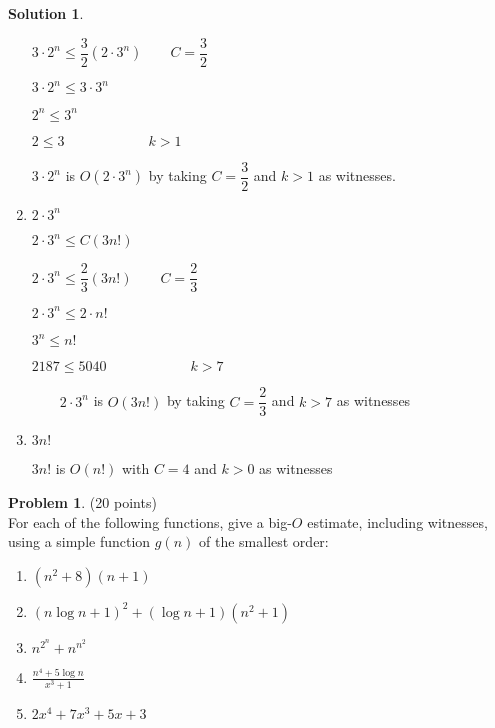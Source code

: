 \documentclass{article}
\theoremstyle{definition}
\newtheorem{problem}{Problem}
\newtheorem*{solution}{Solution}
\begin{document}
\begin{solution}
\begin{enumerate}
\qquad $3\cdot 2^{n}\leq \dfrac{3}{2}(2\cdot 3^{n})\qquad C=\dfrac{3}{2}$

\qquad $3\cdot 2^{n}\leq 3\cdot 3^{n}$

\qquad $2^{n}\leq 3^{n}$

\qquad $2\leq 3\qquad \qquad \qquad k>1$

\qquad $3\cdot 2^{n}$ is $O(2\cdot 3^{n})$ by taking $C=\dfrac{3}{2}$ and $%
k>1$ as witnesses.

\item $2\cdot 3^{n}$

\qquad $2\cdot 3^{n}\leq C(3n!)$

\qquad $2\cdot 3^{n}\leq \dfrac{2}{3}(3n!)\qquad C=\dfrac{2}{3}$

\qquad $2\cdot 3^{n}\leq 2\cdot n!$

\qquad $3^{n}\leq n!$

\qquad $2187\leq 5040\qquad \qquad \qquad k>7$

$\qquad 2\cdot 3^{n}$ is $O(3n!)$ by taking $C=\dfrac{2}{3}$ and $k>7$ as
witnesses$\qquad \qquad $ \bigskip \newline

\item $3n!$ \bigskip 

\qquad $3n!$ is $O(n!)$ with $C=4$ and $k>0$ as witnesses
\end{enumerate}
\end{solution}

\newpage

\begin{problem} (20 points)\\
For each of the following functions, give a big-$O$ estimate, including witnesses, using a simple function $g(n)$ of the smallest order:
\begin{enumerate}
\item $(n^2+8)(n+1)$
\item $(n\log{n} + 1)^2+(\log{n}+1)(n^2+1)$
\item $\displaystyle n^{2^n}+n^{n^2}$
\item $\displaystyle \frac{n^4+5\log{n}}{x^3+1}$
\item $2x^4+7x^3+5x+3$
\end{enumerate}
\end{problem}
\end{document}
